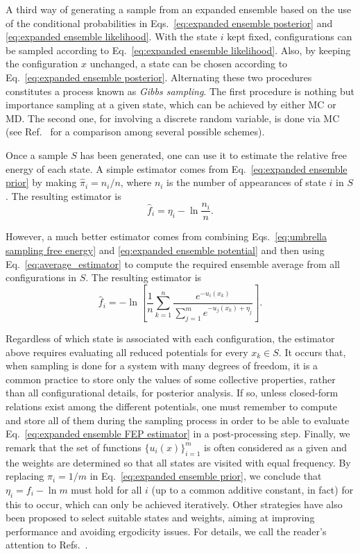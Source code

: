 \documentclass[aip,jcp,reprint,amsmath,amssymb]{revtex4-1}
\begin{document}
A third way of generating a sample from an expanded ensemble based on the use of the conditional probabilities in Eqs.~\eqref{eq:expanded ensemble posterior} and \eqref{eq:expanded ensemble likelihood}. With the state $i$ kept fixed, configurations can be sampled according to Eq.~\eqref{eq:expanded ensemble likelihood}. Also, by keeping the configuration $x$ unchanged, a state can be chosen according to Eq.~\eqref{eq:expanded ensemble posterior}. Alternating these two procedures constitutes a process known as \textit{Gibbs sampling}.\cite{Chodera_2011} The first procedure is nothing but importance sampling at a given state, which can be achieved by either MC or MD. The second one, for involving a discrete random variable, is done via MC (see Ref.~ for a comparison among several possible schemes).

Once a sample $S$ has been generated, one can use it to estimate the relative free energy of each state. A simple estimator comes from Eq.~\eqref{eq:expanded ensemble prior} by making $\hat \pi_i = n_i/n$, where $n_i$ is the number of appearances of state $i$ in $S$. The resulting estimator is
\begin{equation}
\label{eq:expanded ensemble histogram estimator}
\hat f_i = \eta_i - \ln \frac{n_i}{n}.
\end{equation}

However, a much better estimator comes from combining Eqs.~\eqref{eq:umbrella sampling free energy} and \eqref{eq:expanded ensemble potential} and then using Eq.~\eqref{eq:average_estimator} to compute the required ensemble average from all configurations in $S$. The resulting estimator is
\begin{equation}
\label{eq:expanded ensemble FEP estimator}
\hat f_i = -\ln \left[ \frac{1}{n}\sum_{k=1}^n \frac{e^{-u_i(x_k)}}{\sum_{j=1}^m e^{-u_j(x_k) + \eta_j}} \right].
\end{equation}

Regardless of which state is associated with each configuration, the estimator above requires evaluating all reduced potentials for every $x_k \in S$. It occurs that, when sampling is done for a system with many degrees of freedom, it is a common practice to store only the values of some collective properties, rather than all configurational details, for posterior analysis. If so, unless closed-form relations exist among the different potentials, one must remember to compute and store all of them during the sampling process in order to be able to evaluate Eq.~\eqref{eq:expanded ensemble FEP estimator} in a post-processing step. Finally, we remark that the set of functions $\{u_i(x)\}_{i=1}^m$ is often considered as a given and the weights are determined so that all states are visited with equal frequency. By replacing $\pi_i = 1/m$ in Eq.~\eqref{eq:expanded ensemble prior}, we conclude that $\eta_i = f_i - \ln m$ must hold for all $i$ (up to a common additive constant, in fact) for this to occur, which can only be achieved iteratively. Other strategies have also been proposed to select suitable states and weights, aiming at improving performance and avoiding ergodicity issues. For details, we call the reader's attention to Refs.~.
\end{document}
